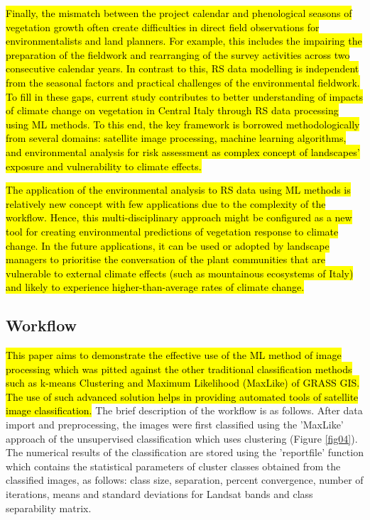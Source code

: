 \documentclass[eprint,
approc,		%
]{actapoly}
\begin{document}
\hl{Finally, the mismatch between the project calendar and phenological seasons of vegetation growth often create difficulties in direct field observations for environmentalists and land planners. For example, this includes the impairing the preparation of the fieldwork and rearranging of the survey activities across two consecutive calendar years. In contrast to this, RS data modelling is independent from the seasonal factors and practical challenges of the environmental fieldwork. To fill in these gaps, current study contributes to better understanding of impacts of climate change on vegetation in Central Italy through RS data processing using ML methods. To this end, the key framework is borrowed methodologically from several domains: satellite image processing, machine learning algorithms, and environmental analysis for risk assessment as complex concept of landscapes' exposure and vulnerability to climate effects. }

\hl{The application of the environmental analysis to RS data using ML methods is relatively new concept with few applications due to the complexity of the workflow. Hence, this multi-disciplinary approach might be configured as a new tool for creating environmental predictions of vegetation response to climate change. In the future applications, it can be used or adopted by landscape managers to prioritise the conversation of the plant communities that are vulnerable to external climate effects (such as mountainous ecosystems of Italy) and likely to experience higher-than-average rates of climate change.}

\subsection{Workflow}
\hl{This paper aims to demonstrate the effective use of the ML method of image processing which was pitted against the other traditional classification methods such as k-means Clustering and Maximum Likelihood (MaxLike) of GRASS GIS. The use of such advanced solution helps in providing automated tools of satellite image classification. }The brief description of the workflow is as follows. After data import and preprocessing, the images were first classified using the 'MaxLike' approach of the unsupervised classification which uses clustering (Figure \ref{fig04}). The numerical results of the classification are stored using the 'reportfile' function which contains the statistical parameters of cluster classes obtained from the classified images, as follows: class size, separation, percent convergence, number of iterations, means and standard deviations for Landsat bands and class separability matrix. 
\end{document}
